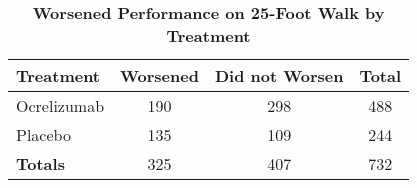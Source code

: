 \documentclass{article}
\begin{document}
	\begin{table}[h]
		\centering
		\footnotesize
		\caption{\textbf{Worsened Performance on 25-Foot Walk by Treatment}}
		\renewcommand{\arraystretch}{1.2}
		\begin{tabular}{lcc|c}
			\toprule
			\textbf{Treatment} & \textbf{Worsened} & \textbf{Did not Worsen} & \textbf{Total} \\
			\midrule
			Ocrelizumab & 190 & 298 & 488 \\
			Placebo & 135 & 109 & 244 \\
			\midrule
			\textbf{Totals} & 325 & 407 & 732 \\
			\bottomrule
		\end{tabular}
	\end{table}

		
\end{document}
